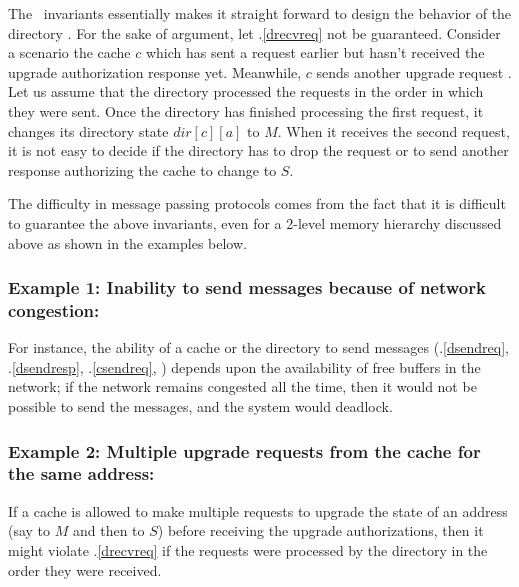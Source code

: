 The \FirstInv\ invariants essentially makes it straight forward to design the
behavior of the directory . For the sake of argument, let
\FirstInv.\ref{drecvreq} not be guaranteed. Consider a scenario the cache $c$
which has sent a request  earlier but hasn't received the
upgrade authorization response yet. Meanwhile, $c$ sends another upgrade request
. Let us assume that the directory processed the requests in
the order in which they were sent. Once the directory has finished processing
the first request, it changes its directory state $dir[c][a]$ to $M$. When it
receives the second request, it is not easy to decide if the directory has to
drop the request or to send another response authorizing the cache to change to
$S$.

The difficulty in message passing protocols comes from the fact that it is
difficult to guarantee the above invariants, even for a 2-level memory hierarchy
discussed above as shown in the examples below.

\subsubsection*{Example 1: Inability to send messages because of network
congestion:}
For instance, the ability of a cache or the directory to send messages
(\FirstInv.\ref{dsendreq}, \FirstInv.\ref{dsendresp}, \FirstInv.\ref{csendreq},
\etc) depends upon the availability of free buffers in the network; if the
network remains congested all the time, then it would not be possible to send the
messages, and the system would deadlock.

\subsubsection*{Example 2: Multiple upgrade requests from the cache for the same
address:}
If a cache is allowed to make multiple requests to upgrade the state of an
address (say to $M$ and then to $S$) before receiving the upgrade
authorizations, then it might violate \FirstInv.\ref{drecvreq} if the requests
were processed by the directory in the order they were received.

